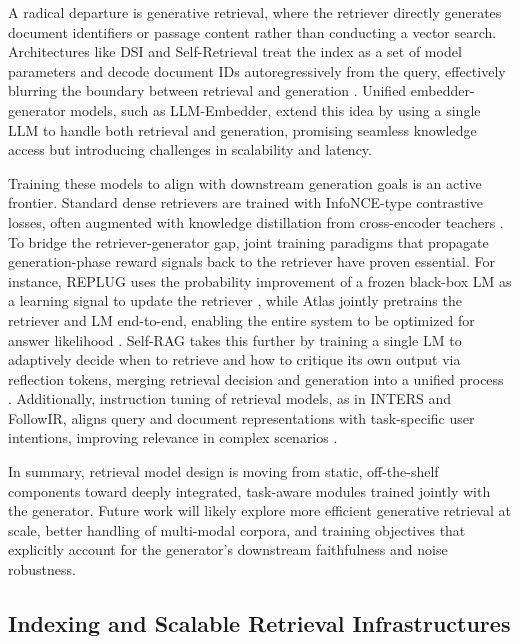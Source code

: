 \documentclass[11pt,a4paper]{article}
\begin{document}
A radical departure is generative retrieval, where the retriever directly generates document identifiers or passage content rather than conducting a vector search. Architectures like DSI and Self-Retrieval treat the index as a set of model parameters and decode document IDs autoregressively from the query, effectively blurring the boundary between retrieval and generation \cite{arxiv:2404.14851v3}. Unified embedder-generator models, such as LLM-Embedder, extend this idea by using a single LLM to handle both retrieval and generation, promising seamless knowledge access but introducing challenges in scalability and latency.

Training these models to align with downstream generation goals is an active frontier. Standard dense retrievers are trained with InfoNCE-type contrastive losses, often augmented with knowledge distillation from cross-encoder teachers \cite{arxiv:2211.14876v1}. To bridge the retriever-generator gap, joint training paradigms that propagate generation-phase reward signals back to the retriever have proven essential. For instance, REPLUG uses the probability improvement of a frozen black-box LM as a learning signal to update the retriever \cite{arxiv:2301.12652v4}, while Atlas jointly pretrains the retriever and LM end-to-end, enabling the entire system to be optimized for answer likelihood \cite{arxiv:2208.03299v3}. Self-RAG takes this further by training a single LM to adaptively decide when to retrieve and how to critique its own output via reflection tokens, merging retrieval decision and generation into a unified process \cite{arxiv:2310.11511v1}. Additionally, instruction tuning of retrieval models, as in INTERS and FollowIR, aligns query and document representations with task-specific user intentions, improving relevance in complex scenarios \cite{arxiv:2401.06532v2,arxiv:2403.15246v1}.

In summary, retrieval model design is moving from static, off-the-shelf components toward deeply integrated, task-aware modules trained jointly with the generator. Future work will likely explore more efficient generative retrieval at scale, better handling of multi-modal corpora, and training objectives that explicitly account for the generator's downstream faithfulness and noise robustness.


\subsection{Indexing and Scalable Retrieval Infrastructures}
\end{document}
